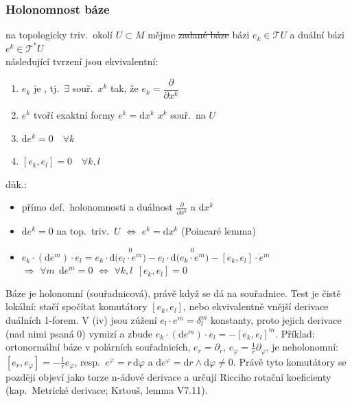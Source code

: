 \subsubsection*{Holonomnost báze}
na topologicky triv.\ okolí $U\subset M$ mějme \sout{zadané báze} bázi $e_k\in\mathcal{T}U$ a duální bázi $e^k\in\mathcal{T}^*U$ \\
následující tvrzení jsou ekvivalentní:

\begin{veta}
\begin{enumerate}[label=(\roman*)]
  \item $e_k$ je , tj.\ $\exists$ souř.\ $x^k$ tak, že $e_k = \dfrac{\partial}{\partial x^k}$
  \item $e^k$ tvoří exaktní formy \quad $e^k = \mathrm{d}x^k$ \quad $x^k$ souř.\ na $U$
  \item $\mathrm{d}e^k = 0 \quad \forall k$
  \item $[e_k,e_l] = 0 \quad \forall k,l$
\end{enumerate}
\end{veta}

důk.:
\begin{itemize}[nosep]
  \item[(i, ii)] přímo def.\ holonomnosti a duálnost $\frac{\partial}{\partial x^k}$ a $\mathrm{d}x^k$
  \item[(iii)] $\mathrm{d}e^k = 0$ na top.\ triv.\ $U$ $\Leftrightarrow$ $e^k = \mathrm{d}x^k$ \quad (Poincaré lemma)
  \item[(iv)] $e_k\cdot(\mathrm{d}e^m)\cdot e_l = e_k\cdot\mathrm{d}\big(\overset{0}{e_l\cdot e^m}\big) - e_l\cdot\mathrm{d}\big(\overset{0}{e_k\cdot e^m}\big) - [e_k,e_l]\cdot e^m$ \\
        $\Rightarrow$ \quad $\forall m\ \ \mathrm{d}e^m = 0$ \quad $\Leftrightarrow$ \quad $\forall k,l\ \ [e_k,e_l] = 0$
\end{itemize}

\begin{vysvetleni}
Báze je holonomní (souřadnicová), právě když se dá  na souřadnice. Test je čistě lokální: stačí spočítat komutátory $[e_k,e_l]$, nebo ekvivalentně vnější derivace duálních 1-forem. V (iv) jsou zúžení $e_l\cdot e^m=\delta^m_l$ konstanty, proto jejich derivace (nad nimi psaná $0$) vymizí a zbude $e_k\cdot(\mathrm{d}e^m)\cdot e_l=-[e_k,e_l]^m$.
Příklad: ortonormální báze v polárních souřadnicích, $e_r=\partial_r$, $e_\varphi=\frac1r\partial_\varphi$, je neholonomní: $[e_r,e_\varphi]=-\frac1{r}e_\varphi$, resp.\ $e^\varphi=r\,\mathrm{d}\varphi$ a $\mathrm{d}e^\varphi=\mathrm{d}r\wedge\mathrm{d}\varphi\neq0$.
Právě tyto komutátory se později objeví jako torze n-ádové derivace a určují Ricciho rotační koeficienty (kap.\ Metrické derivace; Krtouš, lemma V7.11).
\end{vysvetleni}

